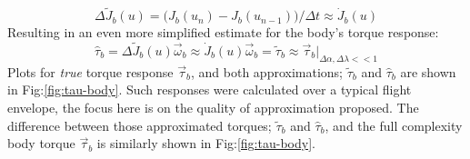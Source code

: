 \begin{equation}
\Delta\widetilde{J}_b(u)=\big(J_b(u_n)-J_b(u_{n-1})\big)/\Delta t\approx\dot{J}_b(u)
\end{equation}
Resulting in an even more simplified estimate for the body's torque response:
\begin{equation}
\hat{\tau}_b=\Delta\widetilde{J}_b(u)\vec{\omega}_b\approx\dot{J}_b(u)\vec{\omega}_b=\widetilde{\tau}_b\approx\vec{\tau}_b\Big|_{\Delta\alpha,\Delta\lambda<<1}
\end{equation}
Plots for \emph{true} torque response $\vec{\tau}_b$, and both approximations; $\widetilde{\tau}_b$ and $\hat{\tau}_b$ are shown in Fig:\ref{fig:tau-body}. Such responses were calculated over a typical flight envelope, the focus here is on the quality of approximation proposed. The difference between those approximated torques; $\widetilde{\tau}_b$ and $\hat{\tau}_b$, and the full complexity body torque $\vec{\tau}_b$ is similarly shown in Fig:\ref{fig:tau-body}.
